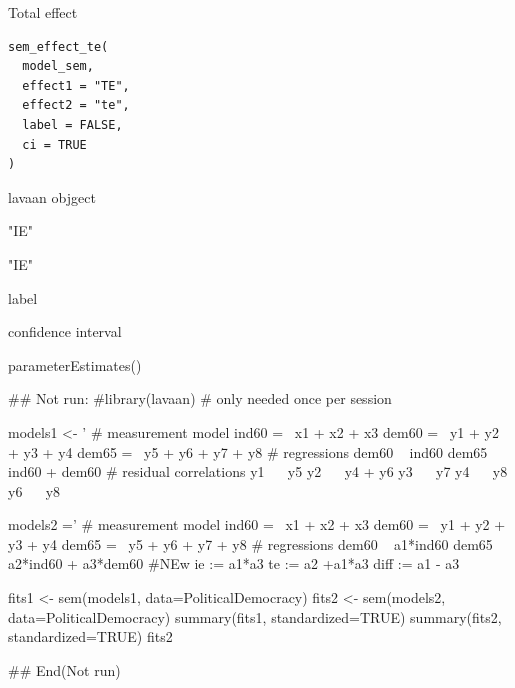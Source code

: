 \documentclass[a4paper]{book}
\begin{document}
%
\begin{Description}
Total effect
\end{Description}
%
\begin{Usage}
\begin{verbatim}
sem_effect_te(
  model_sem,
  effect1 = "TE",
  effect2 = "te",
  label = FALSE,
  ci = TRUE
)
\end{verbatim}
\end{Usage}
%
\begin{Arguments}
\begin{ldescription}
\item[\code{model\_sem}] lavaan objgect

\item[\code{effect1}] "IE"

\item[\code{effect2}] "IE"

\item[\code{label}] label

\item[\code{ci}] confidence interval
\end{ldescription}
\end{Arguments}
%
\begin{Value}
parameterEstimates()
\end{Value}
%
\begin{Examples}
\begin{ExampleCode}

## Not run: 
#library(lavaan) # only needed once per session

models1 <- '
  # measurement model
    ind60 =~ x1 + x2 + x3
    dem60 =~ y1 + y2 + y3 + y4
    dem65 =~ y5 + y6 + y7 + y8
    # regressions
    dem60 ~ ind60
    dem65 ~ ind60 + dem60
      # residual correlations
    y1 ~~ y5
    y2 ~~ y4 + y6
    y3 ~~ y7
    y4 ~~ y8
    y6 ~~ y8

models2 ='
  # measurement model
    ind60 =~ x1 + x2 + x3
    dem60 =~ y1 + y2 + y3 + y4
    dem65 =~ y5 + y6 + y7 + y8
     # regressions
    dem60 ~ a1*ind60
    dem65 ~ a2*ind60 + a3*dem60
 #NEw
   ie := a1*a3
   te := a2 +a1*a3
   diff := a1 - a3




fits1 <- sem(models1, data=PoliticalDemocracy)
fits2 <- sem(models2, data=PoliticalDemocracy)
summary(fits1, standardized=TRUE)
summary(fits2, standardized=TRUE)
fits2 %

## End(Not run)

\end{ExampleCode}
\end{Examples}
\end{document}
